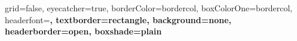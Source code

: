\documentclass[a0paper,portrait,fontscale=0.27]{baposter}
\begin{document}


\begin{poster}{
	grid=false,
	eyecatcher=true, 
	borderColor=bordercol,
	boxColorOne=bordercol,
    headerfont=\bf\Large,
	textborder=rectangle,
	background=none,
	headerborder=open,
    boxshade=plain
}
{

}
\end{poster}
\end{document}
